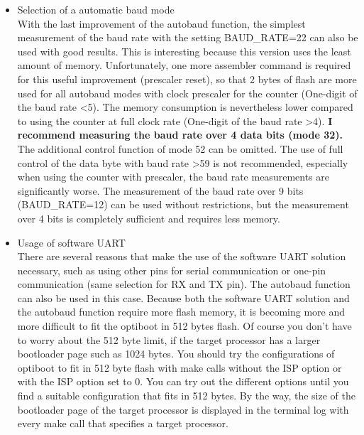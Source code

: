 \begin{itemize}
\item{Selection of a automatic baud mode} \\
With the last improvement of the autobaud function, the simplest measurement of the baud rate
with the setting BAUD\_RATE=22 can also be used with good results.
This is interesting because this version uses the least amount of memory.
Unfortunately, one more assembler command is required for this useful improvement (prescaler reset),
so that 2 bytes of flash are more used for all autobaud modes with clock prescaler
for the counter (One-digit of the baud rate \textless 5).
The memory consumption is nevertheless lower compared to using the counter at full clock rate
(One-digit of the baud rate \textgreater 4).
\textbf {I recommend measuring the baud rate over 4 data bits (mode 32).} The additional control
function of mode 52 can be omitted.
The use of full control of the data byte with baud rate \textgreater 59 is not recommended,
especially when using the counter with prescaler, the baud rate measurements are significantly worse.
The measurement of the baud rate over 9 bits (BAUD\_RATE=12) can be used without restrictions,
but the measurement over 4 bits is completely sufficient and requires less memory.

\item{Usage of software UART} \\
There are several reasons that make the use of the software UART solution necessary,
such as using other pins for serial communication or one-pin communication (same selection for RX and TX pin).
The autobaud function can also be used in this case.
Because both the software UART solution and the autobaud function require more flash memory,
it is becoming more and more difficult to fit the optiboot in 512 bytes flash.
Of course you don't have to worry about the 512 byte limit,
if the target processor has a larger bootloader page such as 1024 bytes.
You should try the configurations of optiboot to fit in 512 byte flash with make calls without the ISP option or with
the ISP option set to 0.
You can try out the different options until you find a suitable configuration that fits in 512 bytes.
By the way, the size of the bootloader page of the target processor is displayed in the terminal log 
with every make call that specifies a target processor.\\


\end{itemize}
